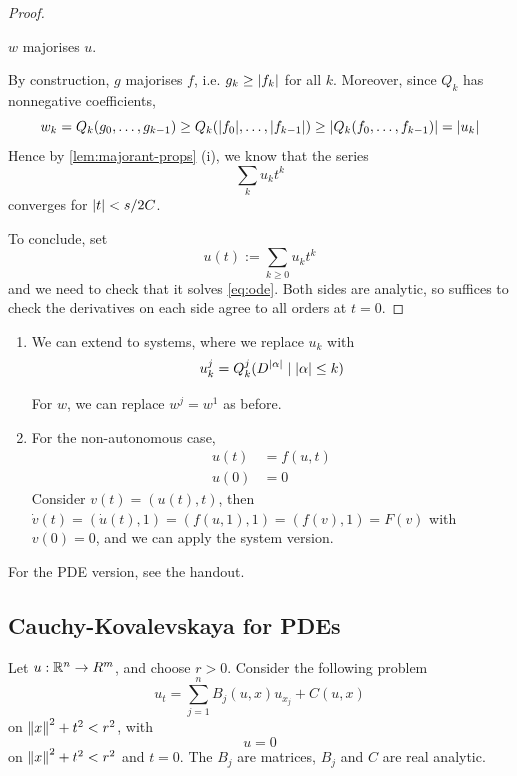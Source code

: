 \documentclass{article}
\begin{document}
\begin{proof}
    \begin{claim}
        \(w\) majorises \(u\).
    \end{claim}

    By construction, \(g\) majorises \(f\), i.e. \(g_k \ge \abs{f_k}\) for all \(k\). Moreover, since \(Q_k\) has nonnegative coefficients,
    \[w_k = Q_k(g_0,\dots, g_{k-1}) \ge Q_k(\abs{f_0}, \dots, \abs{f_{k-1}}) \ge \abs{Q_k(f_0, \dots, f_{k-1})} = \abs{u_k}\]
    Hence by \cref{lem:majorant-props} (i), we know that the series
    \[\sum_k u_kt^k\]
    converges for \(\abs{t} < s/2C\).

    To conclude, set
    \[u(t) := \sum_{k\ge 0}u_kt^k\]
    and we need to check that it solves \cref{eq:ode}. Both sides are analytic, so suffices to check the derivatives on each side agree to all orders at \(t = 0\).
\end{proof}

\begin{remark}
    \begin{enumerate}
        \item We can extend to systems, where we replace \(u_k\) with
        \[u_k^j = Q_k^j(D^\abs{\alpha} \mid \abs{\alpha} \le k)\]
    
        For \(w\), we can replace \(w^j = w^1\) as before.
        \item For the non-autonomous case,
        \begin{align*}
            u(t) &= f(u, t) \\
            u(0) &= 0
        \end{align*}
        Consider \(v(t) = (u(t), t)\), then \(\dot v(t) = (\dot u(t), 1) = (f(u, 1), 1) = (f(v), 1) = F(v)\)
        with \(v(0) = 0\), and we can apply the system version.
    \end{enumerate}
\end{remark}

For the PDE version, see the handout.

\subsection{Cauchy-Kovalevskaya for PDEs}

Let \(u : \mathbb{R}^n \to R^m\), and choose \(r > 0\). Consider the following problem
\[u_t = \sum_{j=1}^n B_j(u, x)u_{x_j} + C(u, x)\]
on \(\norm{x}^2 + t^2 < r^2\), with
\[u = 0\]
on \(\norm{x}^2 + t^2 < r^2\) and \(t = 0\). The \(B_j\) are matrices, \(B_j\) and \(C\) are real analytic.
\end{document}
